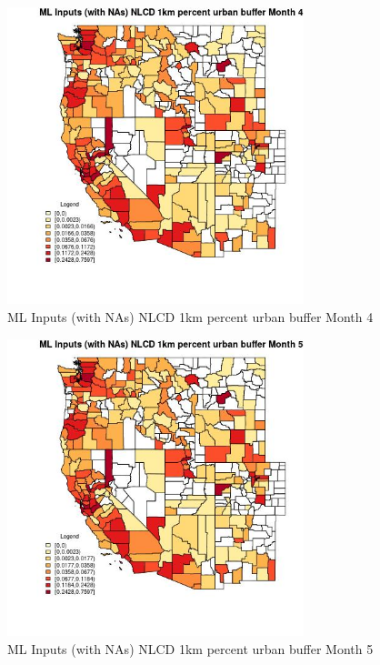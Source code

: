 \begin{figure} 
\centering  
\includegraphics[width=0.77\textwidth]{Code_Outputs/Report_ML_input_PM25_Step4_part_f_de_duplicated_aveswNAs_CountyNLCD_1km_percent_urban_buffermedianMonth4.jpg} 
\caption{\label{fig:Report_ML_input_PM25_Step4_part_f_de_duplicated_aveswNAsCountyNLCD_1km_percent_urban_buffermedianMonth4}ML Inputs (with NAs) NLCD 1km percent urban buffer Month 4} 
\end{figure} 
 

\begin{figure} 
\centering  
\includegraphics[width=0.77\textwidth]{Code_Outputs/Report_ML_input_PM25_Step4_part_f_de_duplicated_aveswNAs_CountyNLCD_1km_percent_urban_buffermedianMonth5.jpg} 
\caption{\label{fig:Report_ML_input_PM25_Step4_part_f_de_duplicated_aveswNAsCountyNLCD_1km_percent_urban_buffermedianMonth5}ML Inputs (with NAs) NLCD 1km percent urban buffer Month 5} 
\end{figure} 
 

